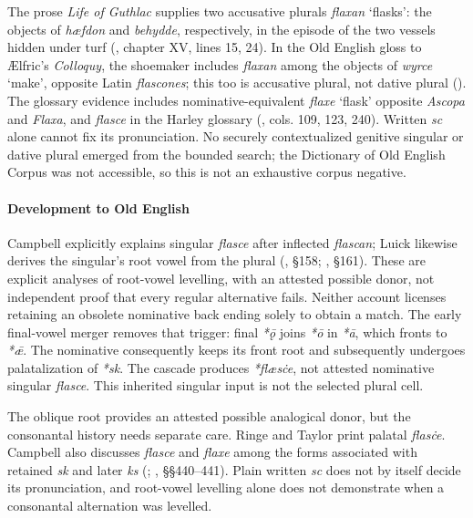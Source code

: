 \documentclass[
  british,
  a4paper,
]{article}
\begin{document}
The prose \emph{Life of Guthlac} supplies two accusative plurals
\emph{flaxan} `flasks': the objects of \emph{hæfdon} and \emph{behydde},
respectively, in the episode of the two vessels hidden under turf
(, chapter XV, lines 15,
24). In the Old English gloss to Ælfric's \emph{Colloquy}, the shoemaker
includes \emph{flaxan} among the objects of \emph{wyrce} `make',
opposite Latin \emph{flascones}; this too is accusative plural, not
dative plural ().
The glossary evidence includes nominative-equivalent \emph{flaxe}
`flask' opposite \emph{Ascopa} and \emph{Flaxa}, and \emph{flasce} in
the Harley glossary (,
cols. 109, 123, 240). Written \emph{sc} alone cannot fix its
pronunciation. No securely contextualized genitive singular or dative
plural emerged from the bounded search; the Dictionary of Old English
Corpus was not accessible, so this is not an exhaustive corpus negative.

\paragraph{Development to Old
English}\label{development-to-old-english-22}

Campbell explicitly explains singular \emph{flasce} after inflected
\emph{flascan}; Luick likewise derives the singular's root vowel from
the plural (, §158;
, §161). These are
explicit analyses of root-vowel levelling, with an attested possible
donor, not independent proof that every regular alternative fails.
Neither account licenses retaining an obsolete nominative back ending
solely to obtain a match. The early final-vowel merger removes that
trigger: final \emph{*ǭ} joins \emph{*ō} in \emph{*ā}, which fronts to
\emph{*ǣ}. The nominative consequently keeps its front root and
subsequently undergoes palatalization of \emph{*sk}. The cascade
produces \emph{*flæsċe}, not attested nominative singular \emph{flasce}.
This inherited singular input is not the selected plural cell.

The oblique root provides an attested possible analogical donor, but the
consonantal history needs separate care. Ringe and Taylor print palatal
\emph{flasċe}. Campbell also discusses \emph{flasce} and \emph{flaxe}
among the forms associated with retained \emph{sk} and later \emph{ks}
(;
, §§440--441). Plain
written \emph{sc} does not by itself decide its pronunciation, and
root-vowel levelling alone does not demonstrate when a consonantal
alternation was levelled.
\end{document}
